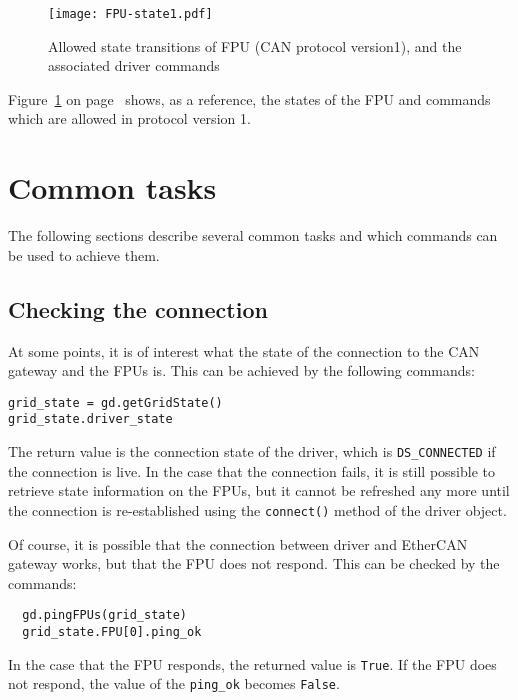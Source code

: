 \documentclass{scrartcl}[12pt,a4paper]
\begin{document}
\begin{figure}

  \texttt{[image: FPU-state1.pdf]}
  \caption{Allowed state transitions of FPU (CAN protocol version1),
    and the associated driver commands}
  \label{fig:states}
\end{figure}


Figure~\ref{fig:states} on page~\pageref{fig:states} shows, as a
reference, the states of the FPU and commands which are allowed in
protocol version 1.




\section{Common tasks}

The following sections describe several common tasks
and which commands can be used to achieve them.


\subsection{Checking the connection}

At some points, it is of interest what the state of
the connection to the CAN gateway and the FPUs is.
This can be achieved by the following commands:
\begin{verbatim}
grid_state = gd.getGridState()
grid_state.driver_state  
\end{verbatim}

The return value is the connection state of the driver, which is
\texttt{DS\_CONNECTED} if the connection is live.  In the case that the
connection fails, it is still possible to retrieve state information
on the FPUs, but it cannot be refreshed any more until the connection
is re-established using the \texttt{connect()} method of the driver
object.

Of course, it is possible that the connection between driver
and EtherCAN gateway works, but that the FPU does not
respond. This can be checked by the commands:

\begin{verbatim}
  gd.pingFPUs(grid_state)
  grid_state.FPU[0].ping_ok
\end{verbatim}

In the case that the FPU responds, the returned value is
\texttt{True}.  If the FPU does not respond, the value of the
\verb+ping_ok+ becomes \texttt{False}.
\end{document}
